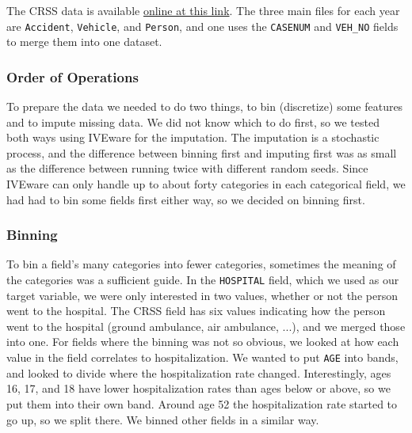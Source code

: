 The CRSS data is available \href{https://www.nhtsa.gov/crash-data-systems/crash-report-sampling-system}{online at this link}.  The three main files for each year are {\tt Accident}, {\tt Vehicle}, and {\tt Person}, and one uses the {\tt CASENUM} and \verb|VEH_NO| fields to merge them into one dataset.  


\subsubsection{Order of Operations}

To prepare the data we needed to do two things, to bin (discretize) some features and to impute missing data.  We did not know which to do first, so we tested both ways using IVEware \citep{IVEware} for the imputation. The imputation is a stochastic process, and the difference between binning first and imputing first was as small as the difference between running twice with different random seeds.  Since IVEware can only handle up to about forty categories in each categorical field, we had had to bin some fields first either way, so we decided on binning first.  

\subsubsection{Binning}
To bin a field's many categories into fewer categories, sometimes the meaning of the categories was a sufficient guide.  In the \verb|HOSPITAL| field, which we used as our target variable, we were only interested in two values, whether or not the person went to the hospital.  The CRSS field has six values indicating how the person went to the hospital (ground ambulance, air ambulance, ...), and we merged those into one.  For fields where the binning was not so obvious, we looked at how each value in the field correlates to hospitalization.  We wanted to put \verb|AGE| into bands, and looked to divide  where the hospitalization rate changed.  Interestingly, ages 16, 17, and 18 have lower hospitalization rates than ages below or above, so we put them into their own band.  Around age 52 the hospitalization rate started to go up, so we split there.  We binned other fields in a similar way.  

